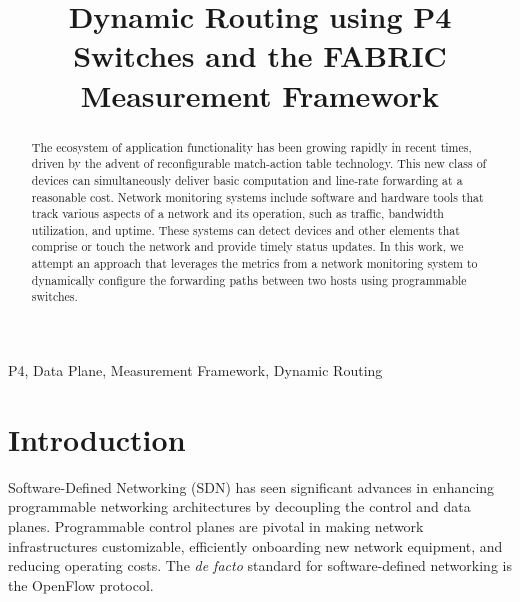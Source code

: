 \documentclass[conference]{IEEEtran}
\begin{document}
	\title{Dynamic Routing using P4 Switches and the FABRIC Measurement Framework\\}

	\author{
	\and
	}
\maketitle

	\begin{abstract}
	The ecosystem of application functionality has been growing rapidly in recent times, driven by the advent of reconfigurable match-action table technology. This new class of devices can simultaneously deliver basic computation and line-rate forwarding at a reasonable cost. Network monitoring systems include software and hardware tools that track various aspects of a network and its operation, such as traffic, bandwidth utilization, and uptime. These systems can detect devices and other elements that comprise or touch the network and provide timely status updates. In this work, we attempt an approach that leverages the metrics from a network monitoring system to dynamically configure the forwarding paths between two hosts using programmable switches.
	\end{abstract}
    \begin{IEEEkeywords} P4, Data Plane, Measurement Framework, Dynamic Routing \end{IEEEkeywords}

    \section{Introduction}
    Software-Defined Networking (SDN) has seen significant advances in enhancing programmable networking architectures by decoupling the control and data planes. Programmable control planes are pivotal in making network infrastructures customizable, efficiently onboarding new network equipment, and reducing operating costs. The \textit{de facto} standard for software-defined networking is the OpenFlow protocol.
\end{document}
